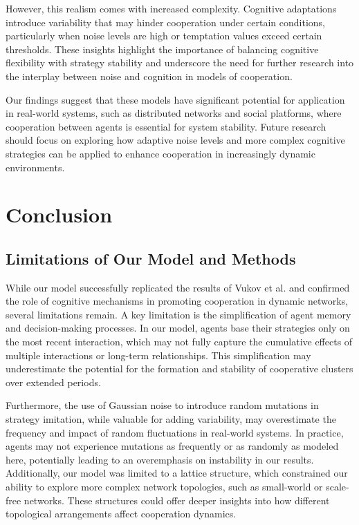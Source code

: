 \documentclass[runningheads]{llncs}
\begin{document}
However, this realism comes with increased complexity. Cognitive adaptations introduce variability that may hinder cooperation under certain conditions, particularly when noise levels are high or temptation values exceed certain thresholds. These insights highlight the importance of balancing cognitive flexibility with strategy stability and underscore the need for further research into the interplay between noise and cognition in models of cooperation.

Our findings suggest that these models have significant potential for application in real-world systems, such as distributed networks and social platforms, where cooperation between agents is essential for system stability.
Future research should focus on exploring how adaptive noise levels and more
complex cognitive strategies can be applied to enhance cooperation in
increasingly dynamic environments.




\section{Conclusion}

\subsection{Limitations of Our Model and Methods}
While our model successfully replicated the results of Vukov et al. \cite{vukov}
and confirmed the role of cognitive mechanisms in promoting cooperation in
dynamic networks, several limitations remain. A key limitation is the
simplification of agent memory and decision-making processes. In our model,
agents base their strategies only on the most recent interaction, which may not
fully capture the cumulative effects of multiple interactions or long-term
relationships. This simplification may underestimate the potential for the formation
and stability of cooperative clusters over extended periods.

Furthermore, the use of Gaussian noise to introduce random mutations in strategy imitation, while valuable for adding variability, may overestimate the frequency and impact of random fluctuations in real-world systems. In practice, agents may not experience mutations as frequently or as randomly as modeled here, potentially leading to an overemphasis on instability in our results. Additionally, our model was limited to a lattice structure, which constrained our ability to explore more complex network topologies, such as small-world or scale-free networks. These structures could offer deeper insights into how different topological arrangements affect cooperation dynamics.
\end{document}
